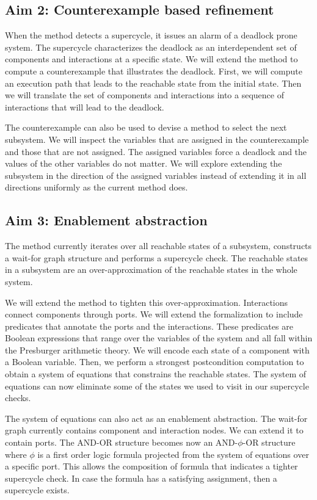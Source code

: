 \subsection{Aim 2: Counterexample based refinement} 

When the method detects a supercycle, it issues an alarm of a 
deadlock prone system. 
The supercycle characterizes the deadlock as an interdependent 
set of components and interactions
at a specific state. 
We will extend the method to compute a counterexample
that illustrates the deadlock. 
First, we will compute an execution path that leads 
to the reachable state from the initial state. 
Then we will translate the set of components and interactions
into a sequence of interactions that will lead to the deadlock. 

The counterexample can also be used to devise a method to
select the next subsystem. 
We will inspect the variables that are assigned
in the counterexample and those that are not assigned. 
The assigned variables force a deadlock and the values of the
other variables do not matter. 
We will explore extending the subsystem in the direction of 
the assigned 
variables instead of extending it in all directions uniformly 
as the current method does. 

\subsection{Aim 3: Enablement abstraction } 

The method currently iterates over all reachable states of
a subsystem, constructs a wait-for graph structure and 
performs a supercycle check. 
The reachable states in a subsystem are an over-approximation
of the reachable states in the whole system. 

We will extend the method to tighten this over-approximation. 
Interactions connect components through ports. 
%
We will extend the formalization to include predicates 
that annotate the ports and the interactions. 
These predicates are Boolean expressions that range over the
variables of the system and all fall within 
the Presburger arithmetic theory. 
%
We will encode each state of a component with a Boolean 
variable.
Then, we perform a strongest postcondition computation to 
obtain a system of equations that constrains the reachable 
states.
%
The system of equations can now eliminate some of the states
we used to visit in our supercycle checks. 

The system of equations can also act as an enablement abstraction.
The wait-for graph currently contains component and interaction nodes. 
We can extend it to contain ports. 
The AND-OR structure becomes now an AND-$\phi$-OR structure
where $\phi$ is a first order logic formula projected from
the system of equations over a specific port. 
This allows the composition of formula that indicates
a tighter supercycle check. 
In case the formula has a satisfying assignment, then
a supercycle exists. 

